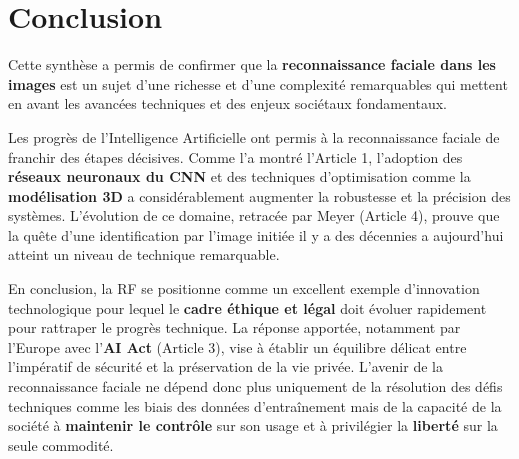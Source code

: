 \documentclass[11pt]{article}
\begin{document}
\section{Conclusion}

Cette synthèse a permis de confirmer que la \textbf{reconnaissance faciale dans les images} est un sujet d'une richesse et d'une 
complexité remarquables qui mettent en avant les avancées techniques et des enjeux sociétaux fondamentaux.

Les progrès de l'Intelligence Artificielle ont permis à la reconnaissance faciale de franchir des étapes décisives. Comme l'a 
montré l'Article 1, l'adoption des \textbf{réseaux neuronaux du CNN} et des techniques d'optimisation comme la 
\textbf{modélisation 3D} a considérablement augmenter la robustesse et la précision des systèmes. L'évolution de ce domaine, 
retracée par Meyer (Article 4), prouve que la quête d'une identification par l'image initiée il y a des décennies a aujourd'hui 
atteint un niveau de technique remarquable.

En conclusion, la RF se positionne comme un excellent exemple d'innovation technologique pour lequel le \textbf{cadre éthique et 
légal} doit évoluer rapidement pour rattraper le progrès technique. La réponse apportée, notamment par l'Europe avec 
l'\textbf{AI Act} (Article 3), vise à établir un équilibre délicat entre l'impératif de sécurité et la préservation de la vie 
privée. L'avenir de la reconnaissance faciale ne dépend donc plus uniquement de la résolution des défis techniques comme les 
biais des données d'entraînement mais de la capacité de la société à \textbf{maintenir le contrôle} sur son usage et à 
privilégier la \textbf{liberté} sur la seule commodité.
\end{document}

